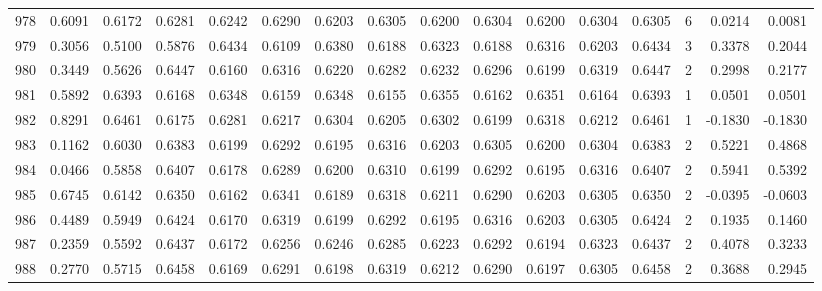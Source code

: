 \begin{tabular}{lrrrrrrrrrrrrrrr}
978 &      0.6091 &  0.6172 &  0.6281 &  0.6242 &  0.6290 &  0.6203 &  0.6305 &  0.6200 &  0.6304 &  0.6200 &   0.6304 &     0.6305 &      6 &                    0.0214 &                     0.0081 \\
979 &      0.3056 &  0.5100 &  0.5876 &  0.6434 &  0.6109 &  0.6380 &  0.6188 &  0.6323 &  0.6188 &  0.6316 &   0.6203 &     0.6434 &      3 &                    0.3378 &                     0.2044 \\
980 &      0.3449 &  0.5626 &  0.6447 &  0.6160 &  0.6316 &  0.6220 &  0.6282 &  0.6232 &  0.6296 &  0.6199 &   0.6319 &     0.6447 &      2 &                    0.2998 &                     0.2177 \\
981 &      0.5892 &  0.6393 &  0.6168 &  0.6348 &  0.6159 &  0.6348 &  0.6155 &  0.6355 &  0.6162 &  0.6351 &   0.6164 &     0.6393 &      1 &                    0.0501 &                     0.0501 \\
982 &      0.8291 &  0.6461 &  0.6175 &  0.6281 &  0.6217 &  0.6304 &  0.6205 &  0.6302 &  0.6199 &  0.6318 &   0.6212 &     0.6461 &      1 &                   -0.1830 &                    -0.1830 \\
983 &      0.1162 &  0.6030 &  0.6383 &  0.6199 &  0.6292 &  0.6195 &  0.6316 &  0.6203 &  0.6305 &  0.6200 &   0.6304 &     0.6383 &      2 &                    0.5221 &                     0.4868 \\
984 &      0.0466 &  0.5858 &  0.6407 &  0.6178 &  0.6289 &  0.6200 &  0.6310 &  0.6199 &  0.6292 &  0.6195 &   0.6316 &     0.6407 &      2 &                    0.5941 &                     0.5392 \\
985 &      0.6745 &  0.6142 &  0.6350 &  0.6162 &  0.6341 &  0.6189 &  0.6318 &  0.6211 &  0.6290 &  0.6203 &   0.6305 &     0.6350 &      2 &                   -0.0395 &                    -0.0603 \\
986 &      0.4489 &  0.5949 &  0.6424 &  0.6170 &  0.6319 &  0.6199 &  0.6292 &  0.6195 &  0.6316 &  0.6203 &   0.6305 &     0.6424 &      2 &                    0.1935 &                     0.1460 \\
987 &      0.2359 &  0.5592 &  0.6437 &  0.6172 &  0.6256 &  0.6246 &  0.6285 &  0.6223 &  0.6292 &  0.6194 &   0.6323 &     0.6437 &      2 &                    0.4078 &                     0.3233 \\
988 &      0.2770 &  0.5715 &  0.6458 &  0.6169 &  0.6291 &  0.6198 &  0.6319 &  0.6212 &  0.6290 &  0.6197 &   0.6305 &     0.6458 &      2 &                    0.3688 &                     0.2945 \\

\end{tabular}
